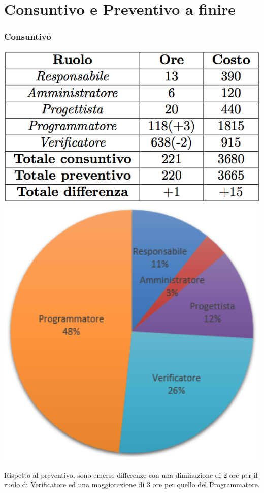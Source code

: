 \section{Consuntivo e Preventivo a finire}
\begin{frame}
  \frametitle{Consuntivo}
  \begin{center}
  	\includegraphics[scale=0.5]{img/prevCD}
  	\includegraphics[scale=0.4]{img/cakeCD}
  \end{center}
Rispetto al preventivo, sono emerse differenze con una diminuzione di 2 ore per il ruolo di Verificatore ed una maggiorazione di 3 ore per quello del Programmatore.
\end{frame}

